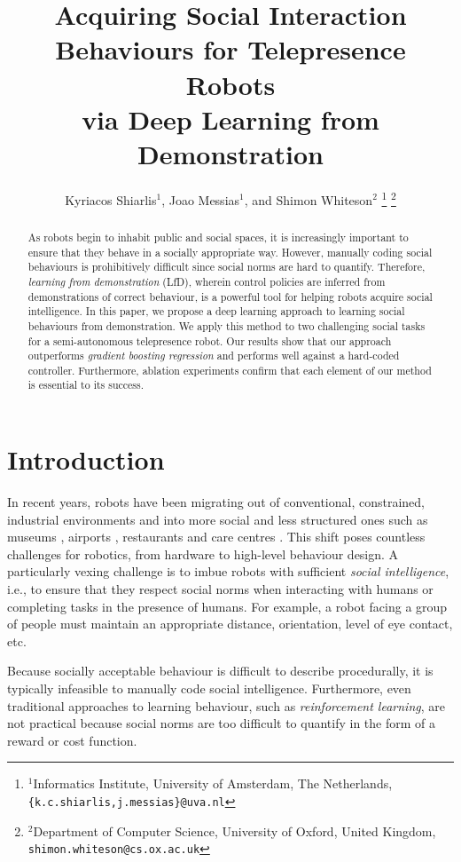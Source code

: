 \documentclass[letterpaper, 10 pt, conference]{ieeeconf}
\title{\LARGE \bf
Acquiring Social Interaction Behaviours for Telepresence Robots\\via Deep Learning from Demonstration 
}
\author{Kyriacos Shiarlis$^{1}$, Joao Messias$^{1}$, and Shimon Whiteson$^{2}$%
\thanks{$^{1}$Informatics Institute, University of Amsterdam, The Netherlands,
         {\tt\small \{k.c.shiarlis,j.messias\}@uva.nl}}%
\thanks{$^{2}$Department of Computer Science, University of Oxford, United Kingdom,
         {\tt\small shimon.whiteson@cs.ox.ac.uk}}%
}
\begin{document}
\maketitle

\thispagestyle{empty}
\pagestyle{empty}


\begin{abstract}
As robots begin to inhabit public and social spaces, it is increasingly important to ensure that they behave in a socially appropriate way. However, manually coding social behaviours is prohibitively difficult since social norms are hard to quantify.  Therefore, \emph{learning from demonstration} (LfD), wherein control policies are inferred from demonstrations of correct behaviour, is a powerful tool for helping robots acquire social intelligence. In this paper, we propose a deep learning approach to learning social behaviours from demonstration.  We apply this method to two challenging social tasks for a semi-autonomous telepresence robot.  Our results show that our approach outperforms \emph{gradient boosting regression} and performs well against a hard-coded controller.  Furthermore, ablation experiments confirm that each element of our method is essential to its success.
\end{abstract}

\section{Introduction}


In recent years, robots have been migrating out of conventional, constrained, industrial environments and into more social and less structured ones such as museums \cite{thrun1999minerva}, airports \cite{triebel2015spencer}, restaurants \cite{qing2010research} and care centres \cite{shiarlis2015teresa}. This shift poses countless challenges for robotics, from hardware  to high-level behaviour design.  A particularly vexing challenge is to imbue robots with sufficient \emph{social intelligence}, i.e., to ensure that they respect social norms when interacting with humans or completing tasks in the presence of humans.  For example, a robot facing a group of people must maintain an appropriate distance, orientation, level of eye contact, etc.

Because socially acceptable behaviour is difficult to describe procedurally, it is typically infeasible to manually code social intelligence.  Furthermore, even traditional approaches to learning behaviour, such as \emph{reinforcement learning}, are not practical because social norms are too difficult to quantify in the form of a reward or cost function.
\end{document}
